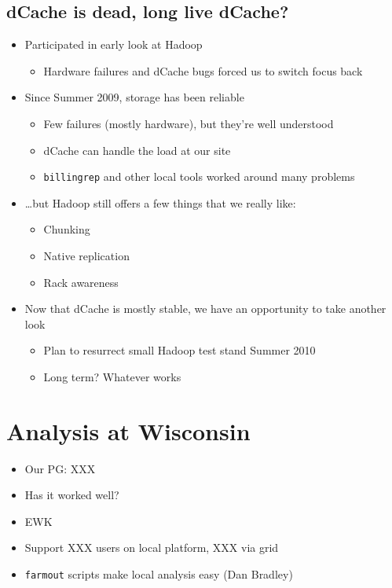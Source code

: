 \documentclass{beamer}
\begin{document}
\subsection{dCache is dead, long live dCache?}
\begin{frame}
\begin{itemize}
	\item Participated in early look at Hadoop
	\begin{itemize}
		\item Hardware failures and dCache bugs forced us to switch focus back
	\end{itemize}
	\item Since Summer 2009, storage has been reliable
	\begin{itemize}
		\item Few failures (mostly hardware), but they're well understood
		\item dCache can handle the load at our site
		\item {\tt billingrep} and other local tools worked around many problems
	\end{itemize}
	\item \ldots{}but Hadoop still offers a few things that we really like:
	\begin{itemize}
		\item Chunking
		\item Native replication
		\item Rack awareness
	\end{itemize}
	\item Now that dCache is mostly stable, we have an opportunity to take another look 
	\begin{itemize}
		\item Plan to resurrect small Hadoop test stand Summer 2010
		\item Long term? Whatever works
	\end{itemize}
\end{itemize}
\end{frame}

\section{Analysis at Wisconsin}
\begin{frame}
\begin{itemize}
	\item Our PG: XXX
	\item Has it worked well?
	\item EWK
	\item Support XXX users on local platform, XXX via grid
	\item {\tt farmout} scripts make local analysis easy (Dan Bradley) 
\end{itemize}
\end{frame}
\end{document}
